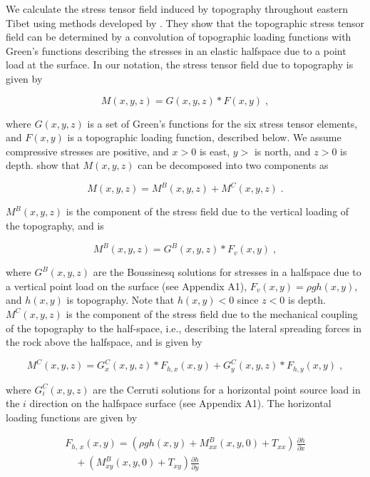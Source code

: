 \documentclass[twocolumn,jgrga]{AGUTeX}
\begin{document}
\begin{article}
We calculate the stress tensor field induced by topography throughout
eastern Tibet using methods developed by 
\citet{liuzoback1992}. They show that the topographic stress tensor
field can be determined by a convolution of topographic loading
functions with Green's functions describing the stresses in an elastic
halfspace due to a point load at the surface. In our notation, the
stress tensor field due to topography is given by

\begin{equation}
M(x, y, z) = G(x, y, z) * F(x, y) \; ,
\end{equation}

where $G(x,y,z)$ is a set of Green's functions for the six stress tensor
elements, and $F(x,y)$ is a topographic loading function, described
below. We assume compressive stresses are positive, and $x>0$ is east,
$y>$ is north, and $z>0$ is depth. \citet{liuzoback1992}
show that $M(x,y,z)$ can be decomposed into two components as

\begin{equation}
M(x,y,z) = M^B(x,y,z) + M^C(x,y,z) \; .
\end{equation}

$M^B(x,y,z)$ is the component of the stress field due to the vertical
loading of the topography, and is

\begin{equation}
M^B(x, y, z) = G^B(x,y,z) * F_v(x, y) \; ,
\label{eqn:bous}
\end{equation}

where $G^B(x,y,z)$ are the Boussinesq solutions for stresses in a
halfspace due to a vertical point load on the surface (see Appendix A1), 
$F_v(x,y) = \rho g h(x,y)$, and $h(x,y)$ is topography. 
Note that $h(x,y)<0$ since $z<0$ is
depth. $M^C(x,y,z)$ is the component of the stress field due to the
mechanical coupling of the topography to the half-space, i.e.,
describing the lateral spreading forces in the rock above the halfspace,
and is given by

\begin{equation}
M^C(x, y, z) = G_x^C(x,y,z) * F_{h, x}(x, y) + G_y^C(x,y,z) * F_{h, y}(x, y) \; ,
\end{equation}

where $G_i^C(x,y,z)$ are the Cerruti solutions for a horizontal point
source load in the $i$ direction on the halfspace surface (see Appendix
A1). The horizontal loading functions are given by

\begin{equation}
\begin{split}
F_{h, \, x}(x,y) = ( \rho g h(x,y) + M_{xx}^B(x,y,0) + T_{xx} )\, \frac{\partial h}{ \partial x} \\
\quad + (M_{xy}^{B}(x,y,0) + T_{xy}) \frac{\partial h}{ \partial y}
\end{split}
\label{eqn:f_hor_xz}
\end{equation}


\end{article}
\end{document}
